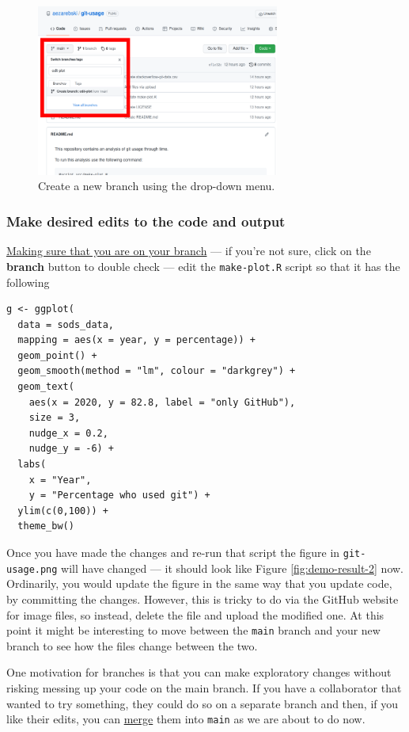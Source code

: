 \documentclass[11pt,onecolumn]{scrartcl}
\begin{document}
\begin{figure}[htbp]
\centering
\includegraphics[width=8cm]{./create-new-branch.png}
\caption{\label{fig:create-new-branch}Create a new branch using the drop-down menu.}
\end{figure}

\subsubsection*{Make desired edits to the code and output}
\label{sec:orgcd867e8}

\uline{Making sure that you are on your branch} --- if you're not sure, click on the
\textbf{branch} button to double check --- edit the \texttt{make-plot.R} script so that it has the
following

\lstset{language=r,label= ,caption= ,captionpos=b,numbers=none}
\begin{lstlisting}
g <- ggplot(
  data = sods_data,
  mapping = aes(x = year, y = percentage)) +
  geom_point() +
  geom_smooth(method = "lm", colour = "darkgrey") +
  geom_text(
    aes(x = 2020, y = 82.8, label = "only GitHub"),
    size = 3,
    nudge_x = 0.2,
    nudge_y = -6) +
  labs(
    x = "Year",
    y = "Percentage who used git") +
  ylim(c(0,100)) +
  theme_bw()
\end{lstlisting}

Once you have made the changes and re-run that script the figure in
\texttt{git-usage.png} will have changed --- it should look like Figure \ref{fig:demo-result-2}
now. Ordinarily, you would update the figure in the same way that you update
code, by committing the changes. However, this is tricky to do via the GitHub
website for image files, so instead, delete the file and upload the modified
one. At this point it might be interesting to move between the \texttt{main} branch and
your new branch to see how the files change between the two.

One motivation for branches is that you can make exploratory changes without
risking messing up your code on the main branch. If you have a collaborator that
wanted to try something, they could do so on a separate branch and then, if you
like their edits, you can \hyperref[sec:orgd1289e1]{merge} them into \texttt{main} as we are about to do now.
\end{document}
